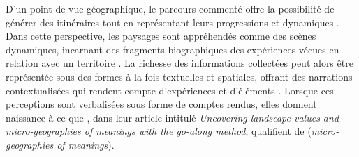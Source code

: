 \begin{refsegment}
D’un point de vue géographique, le parcours commenté offre la possibilité de générer des itinéraires tout en représentant leurs progressions et dynamiques \textcolor{blue}{\autocite[94]{jones_spatial_2012}}. Dans cette perspective, les paysages sont appréhendés comme des scènes dynamiques, incarnant des fragments biographiques des expériences vécues en relation avec un territoire \textcolor{blue}{\autocite[112]{bergeron_uncovering_2014}}. La richesse des informations collectées peut alors être représentée sous des formes à la fois textuelles et spatiales, offrant des narrations contextualisées qui rendent compte d’expériences  et d’éléments  \textcolor{blue}{\autocite[109]{bergeron_uncovering_2014}}. Lorsque ces perceptions sont verbalisées sous forme de comptes rendus, elles donnent naissance à ce que \textcolor{blue}{\textcite[116]{bergeron_uncovering_2014}}, dans leur article intitulé \textsl{Uncovering landscape values and micro-geographies of meanings with the go-along method}, qualifient de  (\textit{micro-geographies of meanings}).%


\end{refsegment}
